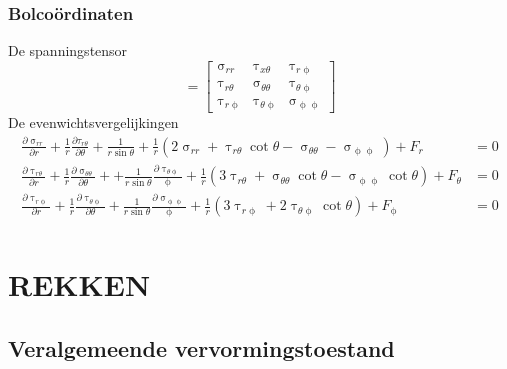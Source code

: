             \subsubsection{Bolcoördinaten}
            De spanningstensor
            \begin{equation}
                [\upsigma] = \left[\begin{matrix}
                    \upsigma_{rr} & \uptau_{x\theta} & \uptau_{r\upphi} \\
                    \uptau_{r\theta} & \upsigma_{\theta \theta} & \uptau_{\theta\upphi} \\
                    \uptau_{r\upphi} & \uptau_{\theta\upphi} & \upsigma_{\upphi\upphi}
                    \label{spanningstensor_bol}
                \end{matrix}\right]
            \end{equation}
            De evenwichtsvergelijkingen
            \begin{align}
                \frac{\partial \upsigma_{rr}}{\partial r} + \frac{1}{r}\frac{\partial \tau_{r\theta}}{\partial \theta} + \frac{1}{r\sin\theta} + \frac{1}{r}\left(2\upsigma_{rr} + \uptau_{r\theta}\cot\theta-\upsigma_{\theta\theta}-\upsigma_{\upphi\upphi}\right) + F_r & = 0\nonumber\\
                \frac{\partial \uptau_{r\theta}}{\partial r} + \frac{1}{r}\frac{\partial \upsigma_{\theta\theta}}{\partial \theta} + +\frac{1}{r\sin\theta}\frac{\partial \uptau_{\theta\upphi}}{\upphi} + \frac{1}{r}\left(3\uptau_{r\theta} + \upsigma_{\theta\theta}\cot\theta-\upsigma_{\upphi\upphi}\cot\theta\right) + F_{\theta} & = 0\nonumber\\
                \frac{\partial \uptau_{r\upphi}}{\partial r} + \frac{1}{r}\frac{\partial \uptau_{\theta\upphi}}{\partial \theta} + \frac{1}{r\sin\theta}\frac{\partial \upsigma_{\upphi\upphi}}{\upphi} + \frac{1}{r}\left(3\uptau_{r\upphi} + 2\uptau_{\theta\upphi}\cot\theta\right)+ F_{\upphi} & = 0\nonumber\\
                \label{vergelijkingen_van_het_evenwicht_bol}
            \end{align}                

    \section{REKKEN}

        \subsection{Veralgemeende vervormingstoestand}

